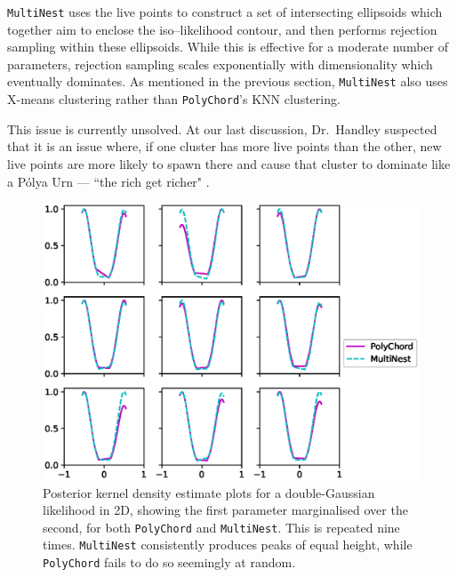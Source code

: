 \documentclass{article}
\begin{document}
\texttt{MultiNest} uses the live points to construct a set of intersecting ellipsoids which together aim to enclose the iso--likelihood contour, and then performs rejection sampling within these ellipsoids. While this is effective for a moderate number of parameters, rejection sampling scales exponentially with dimensionality which eventually dominates. As mentioned in the previous section, \texttt{MultiNest} also uses X-means clustering rather than \texttt{PolyChord}'s KNN clustering.

This issue is currently unsolved. At our last discussion, Dr.~Handley suspected that it is an issue where, if one cluster has more live points than the other, new live points are more likely to spawn there and cause that cluster to dominate like a P\'olya Urn --- ``the rich get richer" \cite{PolyaUrn}.

\begin{figure}[!ht]
  \centering
  \includegraphics{polynestcomparison.eps}
  \caption{Posterior kernel density estimate plots for a double-Gaussian likelihood in 2D, showing the first parameter marginalised over the second, for both \texttt{PolyChord} and \texttt{MultiNest}. This is repeated nine times. \texttt{MultiNest} consistently produces peaks of equal height, while \texttt{PolyChord} fails to do so seemingly at random.}
  \label{fig:polynest}
\end{figure}

\newpage


\newpage
\end{document}
